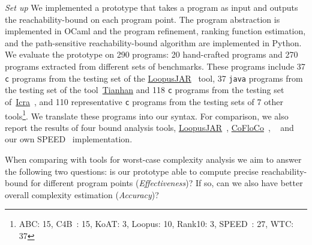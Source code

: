 \emph{Set up} We implemented a prototype {\PSRB} that takes a program as input 
and outputs the reachability-bound on each program point.
The 
program abstraction is implemented in OCaml and the program refinement, ranking function estimation, and the path-sensitive reachability-bound algorithm are implemented in Python.
We evaluate the prototype on 290 programs: 20 hand-crafted programs and 270 programs extracted from different sets of benchmarks. 
These programs include  37 {\tt c} programs 
from the testing set of the \hyperlink{https://forsyte.at/static/people/sinn/loopusJAR/index.html}{LoopusJAR}~\cite{BenchmarkLoopus} tool,
37 {\tt java} programs from the testing set of the tool~\hyperlink{https://zenodo.org/record/5140586\#.Y5pBoC-B1QI}{Tianhan}\cite{BenchmarkTianhan,LuCT21} 
and 118 {\tt c} programs from the testing set of~\hyperlink{https://github.com/icra-team/icra}{Icra}~\cite{KincaidBCR19,CyphertBKR19}, and 110 representative {\tt c} programs from the testing sets of 7 other tools\footnote{ABC: 15, C4B~: 15, KoAT: 3, Loopus: 10, Rank10: 3, SPEED~\cite{GulwaniJK09,GulwaniZ10,GulwaniMC09}: 27, WTC: 37}.
%
We translate these programs into our syntax.
For comparison, we also report the results of four bound analysis tools, 
\hyperlink{https://forsyte.at/software/loopus/}{LoopusJAR}~\cite{SinnZV17},
\hyperlink{https://github.com/aeflores/CoFloCo/tree/master/src}{CoFloCo}~\cite{ToolCofloco},
~\cite{BenchmarkTianhan}
and our own SPEED~\cite{GulwaniJK09} implementation.

When comparing with tools for worst-case
complexity analysis we aim to answer the following two questions: is our prototype able to compute precise reachability-bound for different program points (\emph{Effectiveness})? If so, can we also have better overall complexity estimation (\emph{Accuracy})?

